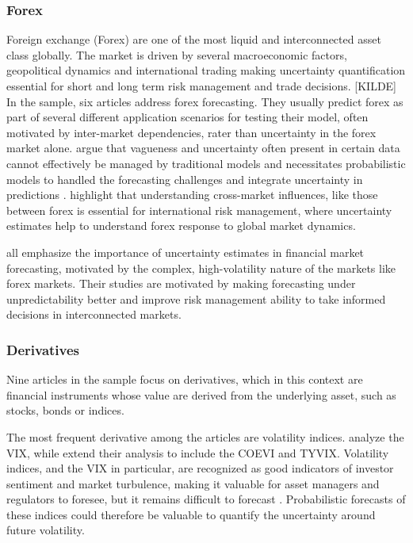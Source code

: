 \subsubsection{Forex}
Foreign exchange (Forex) are one of the most liquid and interconnected asset class globally. The market is driven by several macroeconomic factors, geopolitical dynamics and international trading making uncertainty quantification essential for short and long term risk management and trade decisions. [KILDE]
In the sample, six articles address forex forecasting. They usually predict forex as part of several different application scenarios for testing their model, often motivated by inter-market dependencies, rater than uncertainty in the forex market alone. 
\cite{li2010stochastic} argue that vagueness and uncertainty often present in certain data cannot effectively be managed by traditional models and necessitates probabilistic models to handled the forecasting challenges and integrate uncertainty in predictions \parencite{Moller2007Uncertainty, li2010stochastic}. 
\cite{cao2019multi} highlight that understanding cross-market influences, like those between forex is essential for international risk management, where uncertainty estimates help to understand forex response to global market dynamics.  

\cite{Papaioannou2022gpr, Platanios2014gpr, 
tang2024period} all emphasize the importance of uncertainty estimates in financial market forecasting, motivated by the complex, high-volatility nature of the markets like forex markets. Their studies are motivated by making forecasting under unpredictability better and improve risk management ability to take informed decisions in interconnected markets.  


\subsubsection{Derivatives}
Nine articles in the sample focus on derivatives, which in this context are financial instruments whose value are derived from the underlying asset, such as stocks, bonds or indices. 

The most frequent derivative among the articles are volatility indices. \cite{hortua2024forecasting, Daniali2021} analyze the VIX, while \cite{Tian2023} extend their analysis to include the COEVI and TYVIX. Volatility indices, and the VIX in particular, are recognized as good indicators of investor sentiment and market turbulence, making it valuable for asset managers and regulators to foresee, but it remains difficult to forecast \parencite{hortua2024forecasting}. Probabilistic forecasts  of these indices could therefore be valuable to quantify the uncertainty around future volatility.

